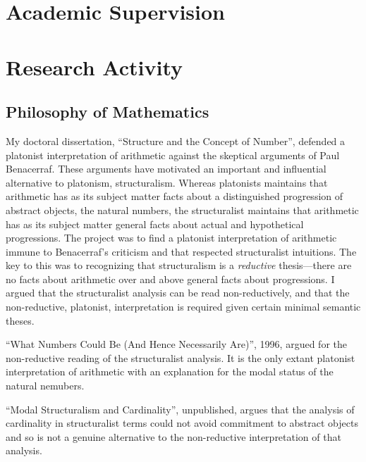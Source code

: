 \documentclass[contbibnum]{cv}
\begin{document}
\section{Academic Supervision}\label{sec:academic_supervision} %




\section{Research Activity}\label{sec:research_activity} %

\subsection{Philosophy of Mathematics}\label{sub:philosophy_of_mathematics} %

My doctoral dissertation, ``Structure and the Concept of Number'', defended a platonist interpretation of arithmetic against the skeptical arguments of Paul Benacerraf. These arguments have motivated an important and influential alternative to platonism, structuralism. Whereas platonists maintains that arithmetic has as its subject matter facts about a distinguished progression of abstract objects, the natural numbers, the structuralist maintains that arithmetic has as its subject matter general facts about actual and hypothetical progressions. The project was to find a platonist interpretation of arithmetic immune to Benacerraf's criticism and that respected structuralist intuitions. The key to this was to recognizing that structuralism is a \emph{reductive} thesis---there are no facts about arithmetic over and above general facts about progressions. I argued that the structuralist analysis can be read non-reductively, and that the non-reductive, platonist, interpretation is required given certain minimal semantic theses. 

``What Numbers Could Be (And Hence Necessarily Are)'', 1996, argued for the non-reductive reading of the structuralist analysis. It is the only extant platonist interpretation of arithmetic with an explanation for the modal status of the natural nemubers.

``Modal Structuralism and Cardinality'', unpublished, argues that the analysis of cardinality in structuralist terms could not avoid commitment to abstract objects and so is not a genuine alternative to the non-reductive interpretation of that analysis.
\end{document}
